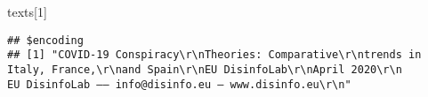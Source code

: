 \documentclass[
]{book}
\newenvironment{Shaded}{\begin{snugshade}}{\end{snugshade}}
\newcommand{\DecValTok}[1]{\textcolor[rgb]{0.00,0.00,0.81}{#1}}
\newcommand{\NormalTok}[1]{#1}
\begin{document}
\begin{Shaded}
\begin{Highlighting}[]
\NormalTok{texts[}\DecValTok{1}\NormalTok{]}
\end{Highlighting}
\end{Shaded}

\begin{verbatim}
## $encoding
## [1] "COVID-19 Conspiracy\r\nTheories: Comparative\r\ntrends in Italy, France,\r\nand Spain\r\nEU DisinfoLab\r\nApril 2020\r\n              EU DisinfoLab –– info@disinfo.eu – www.disinfo.eu\r\n"                                                                                                                                                                                                                                                                                                                                                                                                                                                                                                                                                                                                                                                                                                                                                                                                                                                                                                                                                                                                                                                                                                                                                                                                                                                                                                                                                                                                                                                                                                                                                                                                                                                                                                                                                                                                                                                                                                                                                                                                                                                                                                                                                                                                                                                                                                                                                                                                                                                                                                                                                                                                                                                                                                                                                                                                                                                          
\end{verbatim}
\end{document}
